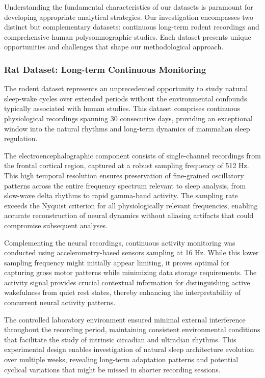\documentclass[a4paper,12pt,twoside]{article}
\begin{document}
Understanding the fundamental characteristics of our datasets is paramount for developing appropriate analytical strategies. Our investigation encompasses two distinct but complementary datasets: continuous long-term rodent recordings and comprehensive human polysomnographic studies. Each dataset presents unique opportunities and challenges that shape our methodological approach.

\subsubsection{Rat Dataset: Long-term Continuous Monitoring}

The rodent dataset represents an unprecedented opportunity to study natural sleep-wake cycles over extended periods without the environmental confounds typically associated with human studies. This dataset comprises continuous physiological recordings spanning 30 consecutive days, providing an exceptional window into the natural rhythms and long-term dynamics of mammalian sleep regulation.

The electroencephalographic component consists of single-channel recordings from the frontal cortical region, captured at a robust sampling frequency of 512 Hz. This high temporal resolution ensures preservation of fine-grained oscillatory patterns across the entire frequency spectrum relevant to sleep analysis, from slow-wave delta rhythms to rapid gamma-band activity. The sampling rate exceeds the Nyquist criterion for all physiologically relevant frequencies, enabling accurate reconstruction of neural dynamics without aliasing artifacts that could compromise subsequent analyses.

Complementing the neural recordings, continuous activity monitoring was conducted using accelerometry-based sensors sampling at 16 Hz. While this lower sampling frequency might initially appear limiting, it proves optimal for capturing gross motor patterns while minimizing data storage requirements. The activity signal provides crucial contextual information for distinguishing active wakefulness from quiet rest states, thereby enhancing the interpretability of concurrent neural activity patterns.

The controlled laboratory environment ensured minimal external interference throughout the recording period, maintaining consistent environmental conditions that facilitate the study of intrinsic circadian and ultradian rhythms. This experimental design enables investigation of natural sleep architecture evolution over multiple weeks, revealing long-term adaptation patterns and potential cyclical variations that might be missed in shorter recording sessions.
\end{document}
